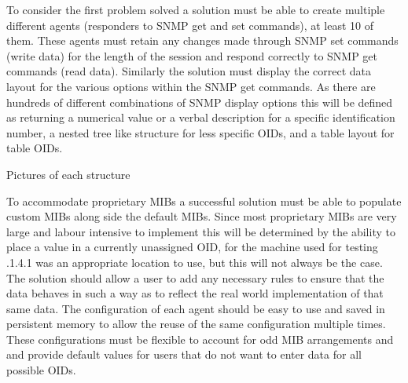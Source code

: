 \documentclass[12pt]{article}
\begin{document}
To consider the first problem solved a solution must be able to create multiple different agents (responders to SNMP get and set commands), at least 10 of them. These agents must retain any changes made through SNMP set commands (write data) for the length of the session and respond correctly to SNMP get commands (read data). Similarly the solution must display the correct data layout for the various options within the SNMP get commands. As there are hundreds of different combinations of SNMP display options this will be defined as returning a numerical value or a verbal description for a specific identification number, a nested tree like structure for less specific OIDs, and a table layout for table OIDs.

Pictures of each structure

To accommodate proprietary MIBs a successful solution must be able to populate custom MIBs along side the default MIBs. Since most proprietary MIBs are very large and labour intensive to implement this will be determined by the ability to place a value in a currently unassigned OID, for the machine used for testing .1.4.1 was an appropriate location to use, but this will not always be the case. The solution should allow a user to add any necessary rules to ensure that the data behaves in such a way as to reflect the real world implementation of that same data. The configuration of each agent should be easy to use and saved in persistent memory to allow the reuse of the same configuration multiple times. These configurations must be flexible to account for odd MIB arrangements and and provide default values for users that do not want to enter data for all possible OIDs.
\end{document}
